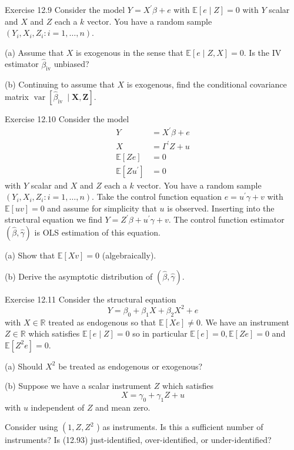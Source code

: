 \documentclass[10pt]{article}
\begin{document}
Exercise 12.9 Consider the model $Y=X^{\prime} \beta+e$ with $\mathbb{E}[e \mid Z]=0$ with $Y$ scalar and $X$ and $Z$ each a $k$ vector. You have a random sample $\left(Y_{i}, X_{i}, Z_{i}: i=1, \ldots, n\right)$.

(a) Assume that $X$ is exogenous in the sense that $\mathbb{E}[e \mid Z, X]=0$. Is the IV estimator $\widehat{\beta}_{\mathrm{iv}}$ unbiased?

(b) Continuing to assume that $X$ is exogenous, find the conditional covariance matrix $\operatorname{var}\left[\widehat{\beta}_{\text {iv }} \mid \boldsymbol{X}, \boldsymbol{Z}\right]$.

Exercise 12.10 Consider the model
$$
\begin{aligned}
Y &=X^{\prime} \beta+e \\
X &=\Gamma^{\prime} Z+u \\
\mathbb{E}[Z e] &=0 \\
\mathbb{E}\left[Z u^{\prime}\right] &=0
\end{aligned}
$$
with $Y$ scalar and $X$ and $Z$ each a $k$ vector. You have a random sample $\left(Y_{i}, X_{i}, Z_{i}: i=1, \ldots, n\right)$. Take the control function equation $e=u^{\prime} \gamma+v$ with $\mathbb{E}[u v]=0$ and assume for simplicity that $u$ is observed. Inserting into the structural equation we find $Y=Z^{\prime} \beta+u^{\prime} \gamma+v$. The control function estimator $(\widehat{\beta}, \widehat{\gamma})$ is OLS estimation of this equation.

(a) Show that $\mathbb{E}[X v]=0$ (algebraically).

(b) Derive the asymptotic distribution of $(\widehat{\beta}, \widehat{\gamma})$.

Exercise 12.11 Consider the structural equation
$$
Y=\beta_{0}+\beta_{1} X+\beta_{2} X^{2}+e
$$
with $X \in \mathbb{R}$ treated as endogenous so that $\mathbb{E}[X e] \neq 0$. We have an instrument $Z \in \mathbb{R}$ which satisfies $\mathbb{E}[e \mid Z]=0$ so in particular $\mathbb{E}[e]=0, \mathbb{E}[Z e]=0$ and $\mathbb{E}\left[Z^{2} e\right]=0$.

(a) Should $X^{2}$ be treated as endogenous or exogenous?

(b) Suppose we have a scalar instrument $Z$ which satisfies
$$
X=\gamma_{0}+\gamma_{1} Z+u
$$
with $u$ independent of $Z$ and mean zero.

Consider using $\left(1, Z, Z^{2}\right.$ ) as instruments. Is this a sufficient number of instruments? Is (12.93) just-identified, over-identified, or under-identified?
\end{document}
